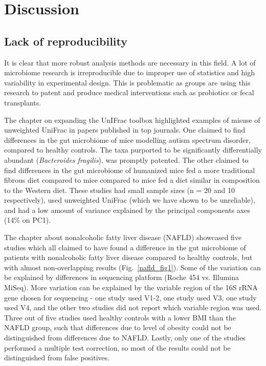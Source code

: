 \chapter{Discussion}

\section{Lack of reproducibility}
It is clear that more robust analysis methods are necessary in this field. A lot of microbiome research is irreproducible due to improper use of statistics and high variability in experimental design. This is problematic as groups are using this research to patent and produce medical interventions such as probiotics or fecal transplants.

The chapter on expanding the UnIFrac toolbox highlighted examples of misuse of unweighted UniFrac in papers published in top journals. One claimed to find differences in the gut microbiome of mice modelling autism spectrum disorder, compared to healthy controls. The taxa purported to be significantly differentially abundant (\textit{Bacteroides fragilis}), was promptly patented. The other claimed to find differences in the gut microbiome of humanized mice fed a more traditional fibrous diet compared to mice compared to mice fed a diet similar in composition to the Western diet. These studies had small sample sizes (n = 20 and 10 respectively), used unweighted UniFrac (which we have shown to be unreliable), and had a low amount of variance explained by the principal components axes (14\% on PC1).

The chapter about nonalcoholic fatty liver disease (NAFLD) showcased five studies which all claimed to have found a difference in the gut microbiome of patients with nonalcoholic fatty liver disease compared to healthy controls, but with almost non-overlapping results (Fig.~\ref{nafld_fig1}). Some of the variation can be explained by differences in sequencing platform (Roche 454 vs. Illumina MiSeq). More variation can be explained by the variable region of the 16S rRNA gene chosen for sequencing - one study used V1-2, one study used V3, one study used V4, and the other two studies did not report which variable region was used. Three out of five studies used healthy controls with a lower BMI than the NAFLD group, such that differences due to level of obesity could not be distinguished from differences due to NAFLD. Lastly, only one of the studies performed a multiple test correction, so most of the results could not be distinguished from false positives.

